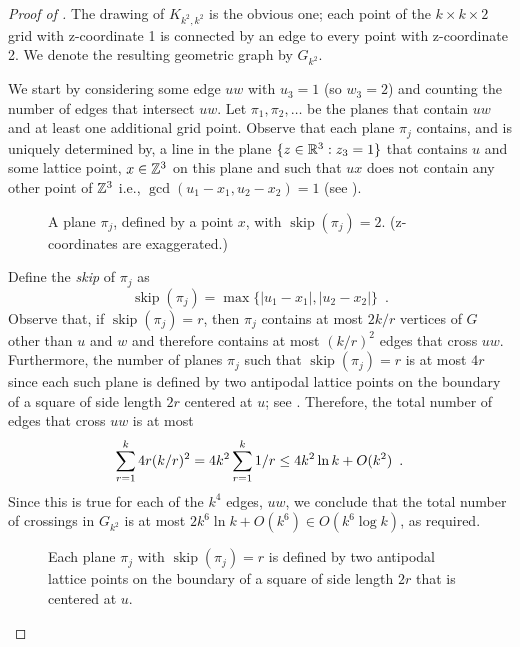 \documentclass{patmorin}
\DeclareMathOperator{\skp}{skip}
\begin{document}
\begin{proof}[Proof of ]
  The drawing of $K_{k^2,k^2}$ is the obvious one; each point of the
  $k\times k\times2$ grid with z-coordinate 1 is connected by an edge
  to every point with z-coordinate 2.  We denote the resulting
  geometric graph by $G_{k^2}$.
  
  We start by considering some edge $uw$ with $u_3=1$ (so
  $w_3=2$) and counting the number of edges that intersect $uw$.
  Let $\pi_1,\pi_2,\ldots$ be the planes that contain $uw$ and at least
  one additional grid point.  Observe that each plane $\pi_j$ contains,
  and is uniquely determined by, a line in the plane $\{z\in\mathbb{R}^3: z_3=1\}$
  that contains $u$ and some lattice point, $x\in\mathbb{Z}^3$ on this plane
  and such that $ux$ does not contain any other point of $\mathbb{Z}^3$ i.e.,
  $\gcd(u_1-x_1,u_2-x_2)=1$ (see ).
  \begin{figure}
    \caption{A plane $\pi_j$, defined by a point $x$, with
      $\skp(\pi_j)=2$. (z-coordinates are exaggerated.)}
  \end{figure}
  Define the \emph{skip} of $\pi_j$ as
  \[
     \skp(\pi_j)=\max\{|u_1-x_1|,|u_2-x_2|\} \enspace .
  \]
  Observe that, if $\skp(\pi_j)=r$, then $\pi_j$ contains at most $2k/r$
  vertices of $G$ other than $u$ and $w$ and therefore contains at most
  $(k/r)^2$ edges that cross $uw$.  Furthermore, the number of planes
  $\pi_j$ such that $\skp(\pi_j)=r$ is at most $4r$ since each such
  plane is defined by two antipodal lattice points on the boundary of a
  square of side length $2r$ centered at $u$; see .
  Therefore, the total number of edges that cross $uw$ is at most
  \begin{equation}
     \sum_{r=1}^k 4r(k/r)^2 = 4k^2\sum_{r=1}^k 1/r 
       \le 4k^2\ln k + O(k^2) \enspace .
        \eqlabel{critical}
  \end{equation}
  Since this is true for each of the $k^4$ edges, $uw$, we conclude
  that the total number of crossings in $G_{k^2}$ is at most $2k^6\ln
  k+O(k^6)\in O(k^6\log k)$, as required.
  \begin{figure}
    \caption{Each plane $\pi_j$ with $\skp(\pi_j)=r$ is defined by two
      antipodal lattice points on the boundary of a square of side length
      $2r$ that is centered at $u$.}
  \end{figure}
\end{proof}
\end{document}
